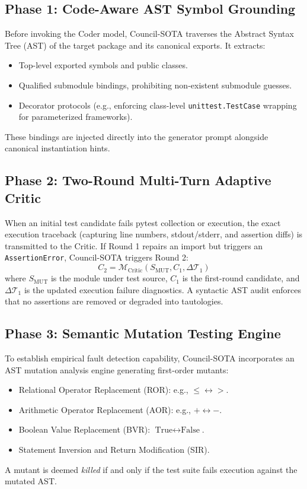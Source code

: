 \documentclass[conference]{IEEEtran}
\begin{document}
\subsection{Phase 1: Code-Aware AST Symbol Grounding}
Before invoking the Coder model, Council-SOTA traverses the Abstract Syntax Tree (AST) of the target package and its canonical exports. It extracts:
\begin{itemize}
    \item Top-level exported symbols and public classes.
    \item Qualified submodule bindings, prohibiting non-existent submodule guesses.
    \item Decorator protocols (e.g., enforcing class-level \texttt{unittest.TestCase} wrapping for parameterized frameworks).
\end{itemize}
These bindings are injected directly into the generator prompt alongside canonical instantiation hints.

\subsection{Phase 2: Two-Round Multi-Turn Adaptive Critic}
When an initial test candidate fails pytest collection or execution, the exact execution traceback (capturing line numbers, stdout/stderr, and assertion diffs) is transmitted to the Critic. If Round 1 repairs an import but triggers an \texttt{AssertionError}, Council-SOTA triggers Round 2:
\begin{equation}
    C_2 = \mathcal{M}_{\text{Critic}}(S_{\text{MUT}}, C_1, \Delta \mathcal{T}_1)
\end{equation}
where $S_{\text{MUT}}$ is the module under test source, $C_1$ is the first-round candidate, and $\Delta \mathcal{T}_1$ is the updated execution failure diagnostics. A syntactic AST audit enforces that no assertions are removed or degraded into tautologies.

\subsection{Phase 3: Semantic Mutation Testing Engine}
To establish empirical fault detection capability, Council-SOTA incorporates an AST mutation analysis engine generating first-order mutants:
\begin{itemize}
    \item Relational Operator Replacement (ROR): e.g., $\le \leftrightarrow >$.
    \item Arithmetic Operator Replacement (AOR): e.g., $+ \leftrightarrow -$.
    \item Boolean Value Replacement (BVR): $\text{True} \leftrightarrow \text{False}$.
    \item Statement Inversion and Return Modification (SIR).
\end{itemize}
A mutant is deemed \textit{killed} if and only if the test suite fails execution against the mutated AST.
\end{document}
